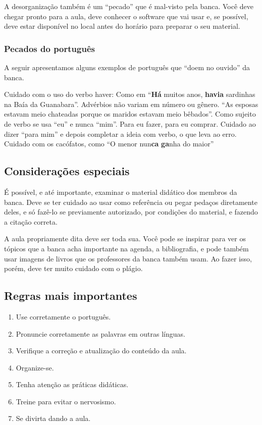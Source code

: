 \documentclass[12pt]{article}
\begin{document}
A desorganização também é um ``pecado'' que é mal-visto pela banca. Você deve chegar pronto para a aula, deve conhecer o software que vai usar e, se possível, deve estar disponível no local antes do horário para preparar o seu material.





\subsubsection{Pecados do português}

A seguir apresentamos alguns exemplos de português que ``doem no ouvido'' da banca.
\begin{outline}
\1 Cuidado com o uso do verbo haver:
\2 Como em ``\textbf{Há} muitos anos, \textbf{havia} sardinhas na Baía da Guanabara''.
\1 Advérbios não variam em número ou gênero.
\2 ``As esposas estavam meio chateadas porque os maridos estavam meio bêbados''.
\1 Como sujeito de verbo se usa ``eu'' e nunca ``mim''. Para eu fazer, para eu comprar. Cuidado ao dizer ``para mim'' e depois  completar a ideia com verbo, o que leva ao erro.
\1 Cuidado com os cacófatos, como ``O menor nun\textbf{ca} \textbf{ga}nha do maior''
\end{outline}

\subsection{Considerações especiais}

É possível, e até importante,  examinar o material didático dos membros da banca. Deve se ter cuidado ao usar como referência ou pegar pedaços diretamente deles, e só fazê-lo se previamente autorizado, por condições do material, e fazendo a citação correta.

A aula propriamente dita deve ser toda sua. Você pode se inspirar para ver os tópicos que a banca acha importante na agenda, a bibliografia, e pode também usar imagens de livros que os professores da banca também usam. Ao fazer isso, porém, deve ter muito cuidado com o plágio.

\subsection{Regras mais importantes}

\begin{enumerate}
\item Use corretamente o português.
\item Pronuncie corretamente as palavras em outras línguas.
\item Verifique a correção e atualização do conteúdo da aula.
\item Organize-se.
\item Tenha atenção as práticas didáticas.
\item Treine para evitar o nervosismo.
\item Se divirta dando a aula.
\end{enumerate}
\end{document}
